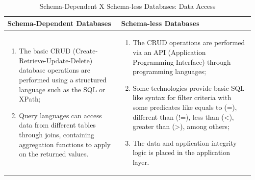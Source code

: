 \begin{table}
    \label{tab:schema-vs-schemaless-daccess}
    \caption{Schema-Dependent X Schema-less Databases: Data Access}
    \begin{center}
    \begin{tabular}{|p{210pt}|p{210pt}|}\hline
    Schema-Dependent Databases & Schema-less Databases\\\hline
    \begin{enumerate}
      \item The basic CRUD (Create-Retrieve-Update-Delete)
      database operations are performed using a structured language such
      as the SQL or XPath;
      \item Query languages can access data from different tables through
      joins, containing aggregation functions to apply on the returned values.
    \end{enumerate} 
    & 
    \begin{enumerate}
      \item The CRUD operations are performed via an API (Application
      Programming Interface) through programming languages;
      \item Some technologies provide basic SQL-like syntax for filter criteria
      with some predicates like equals to (=), different than (!=), less than
      (<), greater than (>), among others;
      \item The data and application integrity logic is placed in the
      application layer.
    \end{enumerate}
    \\\hline
    \end{tabular}
    \end{center}
\end{table}

